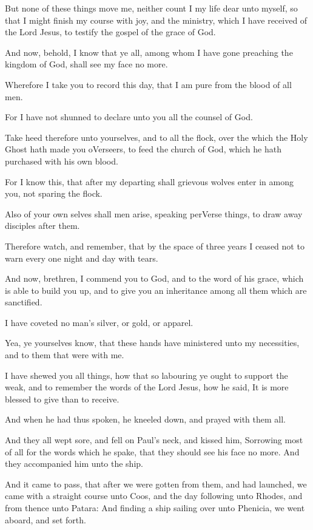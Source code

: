 \Verse But none of these things move me, neither count I my life dear unto myself, so that I might finish my course with joy, and the ministry, which I have received of the Lord Jesus, to testify the gospel of the grace of God.

\Verse And now, behold, I know that ye all, among whom I have gone preaching the kingdom of God, shall see my face no more.

\Verse Wherefore I take you to record this day, that I am pure from the blood of all men.

\Verse For I have not shunned to declare unto you all the counsel of God.

\Verse Take heed therefore unto yourselves, and to all the flock, over the which the Holy Ghost hath made you oVerseers, to feed the church of God, which he hath purchased with his own blood.

\Verse For I know this, that after my departing shall grievous wolves enter in among you, not sparing the flock.

\Verse Also of your own selves shall men arise, speaking perVerse things, to draw away disciples after them.

\Verse Therefore watch, and remember, that by the space of three years I ceased not to warn every one night and day with tears.

\Verse And now, brethren, I commend you to God, and to the word of his grace, which is able to build you up, and to give you an inheritance among all them which are sanctified.

\Verse I have coveted no man's silver, or gold, or apparel.

\Verse Yea, ye yourselves know, that these hands have ministered unto my necessities, and to them that were with me.

\Verse I have shewed you all things, how that so labouring ye ought to support the weak, and to remember the words of the Lord Jesus, how he said, It is more blessed to give than to receive.

\Verse And when he had thus spoken, he kneeled down, and prayed with them all.

\Verse And they all wept sore, and fell on Paul's neck, and kissed him, \Verse Sorrowing most of all for the words which he spake, that they should see his face no more. And they accompanied him unto the ship.


\Chapter
\Verse And it came to pass, that after we were gotten from them, and had launched, we came with a straight course unto Coos, and the day following unto Rhodes, and from thence unto Patara: \Verse And finding a ship sailing over unto Phenicia, we went aboard, and set forth.

